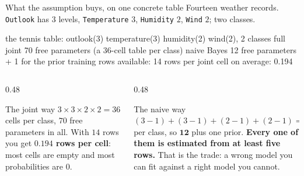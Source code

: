 \documentclass[aspectratio=169]{beamer}
\begin{document}
\begin{frame}[fragile,shrink=7]{What the assumption buys, on one concrete table}
Fourteen weather records. \texttt{Outlook} has $3$ levels,
\texttt{Temperature} $3$, \texttt{Humidity} $2$, \texttt{Wind} $2$;
two classes.
\begin{outblk}
the tennis table: outlook(3) temperature(3) humidity(2) wind(2), 2 classes
   full joint        70 free parameters (a 36-cell table per class)
   naive Bayes       12 free parameters + 1 for the prior
   training rows available: 14
   rows per joint cell on average: 0.194
\end{outblk}
\begin{columns}[T]
  \begin{column}{0.48\textwidth}
    \begin{block}{The joint way}
      \footnotesize $3\times3\times2\times2 = 36$ cells per class, $70$ free
      parameters in all. With $14$ rows you get \textbf{$0.194$ rows per
      cell}: most cells are empty and most probabilities are $0$.
    \end{block}
  \end{column}
  \begin{column}{0.48\textwidth}
    \begin{alertblock}{The naive way}
      \footnotesize $(3-1)+(3-1)+(2-1)+(2-1) = 6$ per class, so
      $\mathbf{12}$ plus one prior. \textbf{Every one of them is estimated
      from at least five rows.} That is the trade: a wrong model you can fit
      against a right model you cannot.
    \end{alertblock}
  \end{column}
\end{columns}
\end{frame}
\end{document}
